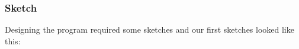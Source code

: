 \subsubsection{Sketch}

Designing the program required some sketches and our first sketches looked like this:










